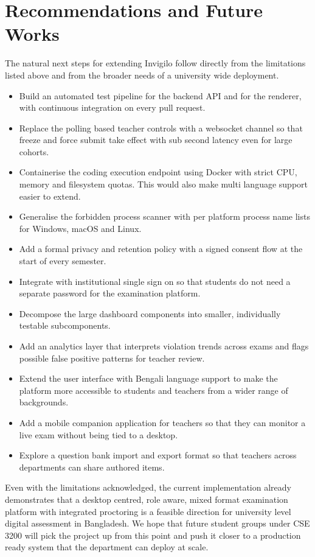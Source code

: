 \documentclass[12pt, a4paper]{report}
\begin{document}
\section{Recommendations and Future Works}

\begin{justify}
  {\fontsize{12}{18}\selectfont
    The natural next steps for extending Invigilo follow directly from the limitations listed above and from the broader needs of a university wide deployment.

    \begin{itemize}
        \item Build an automated test pipeline for the backend API and for the renderer, with continuous integration on every pull request.
        \item Replace the polling based teacher controls with a websocket channel so that freeze and force submit take effect with sub second latency even for large cohorts.
        \item Containerise the coding execution endpoint using Docker with strict CPU, memory and filesystem quotas. This would also make multi language support easier to extend.
        \item Generalise the forbidden process scanner with per platform process name lists for Windows, macOS and Linux.
        \item Add a formal privacy and retention policy with a signed consent flow at the start of every semester.
        \item Integrate with institutional single sign on so that students do not need a separate password for the examination platform.
        \item Decompose the large dashboard components into smaller, individually testable subcomponents.
        \item Add an analytics layer that interprets violation trends across exams and flags possible false positive patterns for teacher review.
        \item Extend the user interface with Bengali language support to make the platform more accessible to students and teachers from a wider range of backgrounds.
        \item Add a mobile companion application for teachers so that they can monitor a live exam without being tied to a desktop.
        \item Explore a question bank import and export format so that teachers across departments can share authored items.
    \end{itemize}

    Even with the limitations acknowledged, the current implementation already demonstrates that a desktop centred, role aware, mixed format examination platform with integrated proctoring is a feasible direction for university level digital assessment in Bangladesh. We hope that future student groups under CSE 3200 will pick the project up from this point and push it closer to a production ready system that the department can deploy at scale.
  }
\end{justify}
\end{document}

